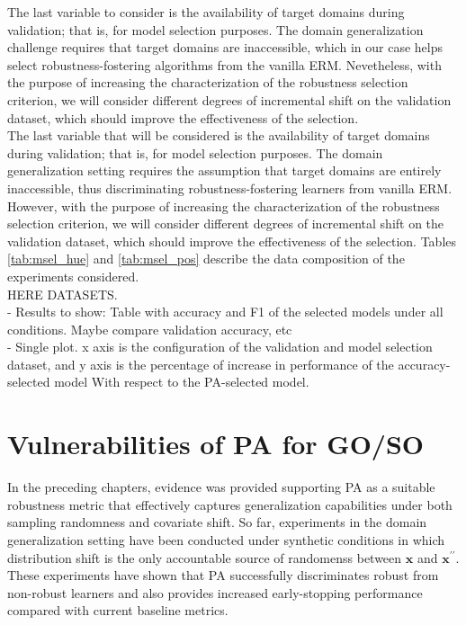 The last variable to consider is the availability of target domains during validation; that is,
for model selection purposes. The domain generalization challenge requires that target domains are
inaccessible, which in our case helps select robustness-fostering algorithms from the 
vanilla ERM. Nevetheless, with the purpose of increasing the characterization of the robustness 
selection criterion, we will consider different degrees of incremental shift on the validation 
dataset, which should improve the effectiveness of the selection. \\

The last variable that will be considered is the availability of target domains during validation; 
that is, for model selection purposes. The domain generalization setting requires the assumption
that target domains are entirely inaccessible, thus discriminating robustness-fostering learners
from vanilla ERM. However, with the purpose of increasing the characterization of the robustness 
selection criterion, we will consider different degrees of incremental shift on the validation 
dataset, which should improve the effectiveness of the 
selection. Tables \ref{tab:msel_hue} and \ref{tab:msel_pos} describe the data composition of the
experiments considered. \\

HERE DATASETS. \\

- Results to show: Table with accuracy and F1 of the selected models under all conditions. 
Maybe compare validation accuracy, etc \\

- Single plot. x axis is the configuration of the validation and model selection dataset,
and y axis is the percentage of increase in performance of the accuracy-selected model With
respect to the PA-selected model. \\

\section{Vulnerabilities of PA for GO/SO}

In the preceding chapters, evidence was provided supporting PA as a suitable robustness metric 
that effectively captures generalization capabilities under both sampling randomness and 
covariate shift. So far, experiments in the domain generalization setting have been conducted 
under synthetic conditions in which distribution shift is the only accountable source of randomenss 
between  $\bm{x}$ and $\bm{x}^{\prime \prime}$. These experiments have shown that PA successfully 
discriminates robust from non-robust learners and also provides increased early-stopping performance compared with
current baseline metrics. \\

